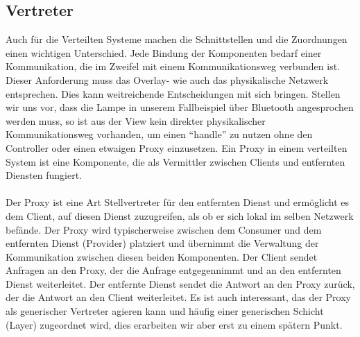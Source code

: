 \documentclass[../vs-script-first-v01.tex]{subfiles}
\begin{document}
\subsection{Vertreter}
Auch für die Verteilten Systeme machen die Schnittstellen und die Zuordnungen einen wichtigen Unterschied. Jede Bindung der Komponenten bedarf einer Kommunikation, die im Zweifel mit einem Kommunikationsweg  verbunden ist. Dieser Anforderung muss das Overlay- wie auch das physikalische Netzwerk entsprechen. Dies kann weitreichende Entscheidungen mit sich bringen. Stellen wir uns vor, dass die Lampe in unserem Fallbeispiel über Bluetooth angesprochen werden muss, so ist aus der View kein direkter physikalischer Kommunikationsweg vorhanden, um einen \enquote{handle} zu nutzen ohne den Controller oder einen etwaigen Proxy einzusetzen.  Ein Proxy in einem verteilten System ist eine Komponente, die als Vermittler zwischen Clients und entfernten Diensten fungiert. 
\\\\
Der Proxy ist eine Art Stellvertreter für den entfernten Dienst und ermöglicht es dem Client, auf diesen Dienst zuzugreifen, als ob er sich lokal im selben Netzwerk befände.
Der Proxy wird typischerweise zwischen dem Consumer und dem entfernten Dienst (Provider) platziert und übernimmt die Verwaltung der Kommunikation zwischen diesen beiden Komponenten. Der Client sendet Anfragen an den Proxy, der die Anfrage entgegennimmt und an den entfernten Dienst weiterleitet. Der entfernte Dienst sendet die Antwort an den Proxy zurück, der die Antwort an den Client weiterleitet. Es ist auch interessant, das der Proxy als generischer Vertreter agieren kann und häufig einer generischen Schicht (Layer) zugeordnet wird, dies erarbeiten wir aber erst zu einem spätern Punkt. \\\\
\end{document}
